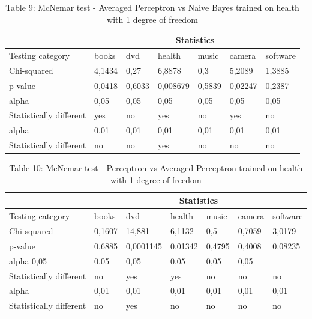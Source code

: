 \begin{table}[htdp]
\caption*{Table 9: McNemar test - Averaged Perceptron vs Naive Bayes trained on health with 1 degree of freedom}
\begin{center}
\begin{tabular}{ | l | l | l | l | l | l | l |}

\hline
& \multicolumn{6}{|c|}{Statistics}\\
\hline
Testing category &books &dvd &health  &music &camera  &software \\
\hline
Chi-squared & 4,1434 & 0,27 & 6,8878 & 0,3 & 5,2089 & 1,3885 \\
p-value & 0,0418 & 0,6033  & 0,008679 & 0,5839 & 0,02247  & 0,2387 \\
alpha & 0,05 & 0,05 & 0,05  & 0,05 & 0,05  & 0,05 \\
Statistically different & yes & no  & yes & no & yes & no \\
alpha  & 0,01  & 0,01 & 0,01 & 0,01 & 0,01 & 0,01 \\
Statistically different  & no & no & yes & no & no & no \\
\hline

\end{tabular}
\end{center}
\label{default}
\end{table}

\begin{table}[htdp]
\caption*{Table 10: McNemar test - Perceptron vs Averaged Perceptron trained on health with 1 degree of freedom}
\begin{center}
\begin{tabular}{ | l | l | l | l | l | l | l |}

\hline
& \multicolumn{6}{|c|}{Statistics}\\
\hline
Testing category &books &dvd &health  &music &camera  &software \\
\hline
Chi-squared & 0,1607 & 14,881 & 6,1132  & 0,5 & 0,7059 & 3,0179 \\
p-value & 0,6885 & 0,0001145  & 0,01342 & 0,4795 & 0,4008  & 0,08235 \\
alpha  0,05 & 0,05 & 0,05  & 0,05 & 0,05  & 0,05 \\
Statistically different & no & yes  & yes & no & no & no \\
alpha  & 0,01  & 0,01 & 0,01 & 0,01 & 0,01 & 0,01 \\
Statistically different  & no & yes & no & no & no & no \\
\hline

\end{tabular}
\end{center}
\label{default}
\end{table}